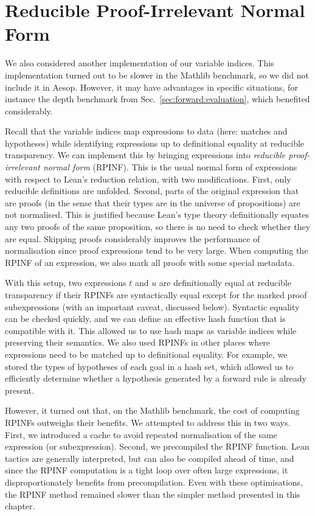 \section{Reducible Proof-Irrelevant Normal Form}%
\label{sec:forward:rpinf}

We also considered another implementation of our variable indices.
This implementation turned out to be slower in the Mathlib benchmark, so we did not include it in Aesop.
However, it may have advantages in specific situations, for instance the depth benchmark from Sec.~\ref{sec:forward:evaluation}, which benefited considerably.

Recall that the variable indices map expressions to data (here: matches and hypotheses) while identifying expressions up to definitional equality at reducible transparency.
We can implement this by bringing expressions into \emph{reducible proof-irrelevant normal form} (RPINF).
This is the usual normal form of expressions with respect to Lean's reduction relation, with two modifications.
First, only reducible definitions are unfolded.
Second, parts of the original expression that are proofs (in the sense that their types are in the universe of propositions) are not normalised.
This is justified because Lean's type theory definitionally equates any two proofs of the same proposition, so there is no need to check whether they are equal.
Skipping proofs considerably improves the performance of normalisation since proof expressions tend to be very large.
When computing the RPINF of an expression, we also mark all proofs with some special metadata.

With this setup, two expressions $t$ and $u$ are definitionally equal at reducible transparency if their RPINFs are syntactically equal except for the marked proof subexpressions (with an important caveat, discussed below).
Syntactic equality can be checked quickly, and we can define an effective hash function that is compatible with it.
This allowed us to use hash maps as variable indices while preserving their semantics.
We also used RPINFs in other places where expressions need to be matched up to definitional equality.
For example, we stored the types of hypotheses of each goal in a hash set, which allowed us to efficiently determine whether a hypothesis generated by a forward rule is already present.

However, it turned out that, on the Mathlib benchmark, the cost of computing RPINFs outweighs their benefits.
We attempted to address this in two ways.
First, we introduced a cache to avoid repeated normalisation of the same expression (or subexpression).
Second, we precompiled the RPINF function.
Lean tactics are generally interpreted, but can also be compiled ahead of time, and since the RPINF computation is a tight loop over often large expressions, it disproportionately benefits from precompilation.
Even with these optimisations, the RPINF method remained slower than the simpler method presented in this chapter.

